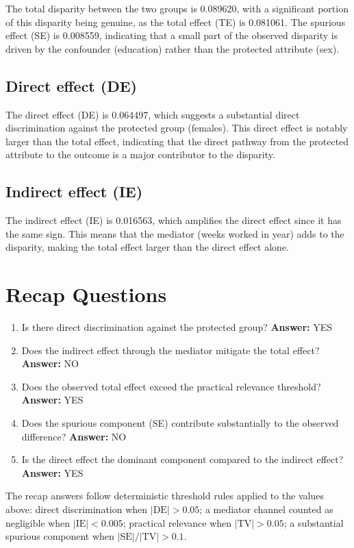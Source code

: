 \documentclass[11pt]{article}
\begin{document}
The total disparity between the two groups is 0.089620, with a significant portion of this disparity being genuine, as the total effect (TE) is 0.081061. The spurious effect (SE) is 0.008559, indicating that a small part of the observed disparity is driven by the confounder (education) rather than the protected attribute (sex).

\subsection{Direct effect (DE)}

The direct effect (DE) is 0.064497, which suggests a substantial direct discrimination against the protected group (females). This direct effect is notably larger than the total effect, indicating that the direct pathway from the protected attribute to the outcome is a major contributor to the disparity.

\subsection{Indirect effect (IE)}

The indirect effect (IE) is 0.016563, which amplifies the direct effect since it has the same sign. This means that the mediator (weeks worked in year) adds to the disparity, making the total effect larger than the direct effect alone.

\section{Recap Questions}

\begin{enumerate}
\item Is there direct discrimination against the protected group? \textbf{Answer:} YES
\item Does the indirect effect through the mediator mitigate the total effect? \textbf{Answer:} NO
\item Does the observed total effect exceed the practical relevance threshold? \textbf{Answer:} YES
\item Does the spurious component (SE) contribute substantially to the observed difference? \textbf{Answer:} NO
\item Is the direct effect the dominant component compared to the indirect effect? \textbf{Answer:} YES
\end{enumerate}

\vspace{1em}
\noindent\footnotesize
The recap answers follow deterministic threshold rules applied to the values above: direct discrimination when $|\mathrm{DE}| > 0.05$; a mediator channel counted as negligible when $|\mathrm{IE}| < 0.005$; practical relevance when $|\mathrm{TV}| > 0.05$; a substantial spurious component when $|\mathrm{SE}| / |\mathrm{TV}| > 0.1$.
\end{document}
